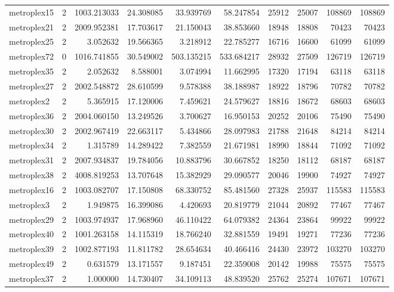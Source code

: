 \begin{longtable}{|l|r|r|r|r|r|r|r|r|r|}
metroplex15 & 2 & 1003.213033 & 24.308085 & 33.939769 & 58.247854 & 25912 & 25007 & 108869 & 108869 \\
metroplex21 & 2 & 2009.952381 & 17.703617 & 21.150043 & 38.853660 & 18948 & 18808 & 70423 & 70423 \\
metroplex25 & 2 & 3.052632 & 19.566365 & 3.218912 & 22.785277 & 16716 & 16600 & 61099 & 61099 \\
metroplex72 & 0 & 1016.741855 & 30.549002 & 503.135215 & 533.684217 & 28932 & 27509 & 126719 & 126719 \\
metroplex35 & 2 & 2.052632 & 8.588001 & 3.074994 & 11.662995 & 17320 & 17194 & 63118 & 63118 \\
metroplex27 & 2 & 2002.548872 & 28.610599 & 9.578388 & 38.188987 & 18922 & 18796 & 70782 & 70782 \\
metroplex2 & 2 & 5.365915 & 17.120006 & 7.459621 & 24.579627 & 18816 & 18672 & 68603 & 68603 \\
metroplex36 & 2 & 2004.060150 & 13.249526 & 3.700627 & 16.950153 & 20252 & 20106 & 75490 & 75490 \\
metroplex30 & 2 & 2002.967419 & 22.663117 & 5.434866 & 28.097983 & 21788 & 21648 & 84214 & 84214 \\
metroplex34 & 2 & 1.315789 & 14.289422 & 7.382559 & 21.671981 & 18990 & 18844 & 71092 & 71092 \\
metroplex31 & 2 & 2007.934837 & 19.784056 & 10.883796 & 30.667852 & 18250 & 18112 & 68187 & 68187 \\
metroplex38 & 2 & 4008.819253 & 13.707648 & 15.382929 & 29.090577 & 20046 & 19900 & 74927 & 74927 \\
metroplex16 & 2 & 1003.082707 & 17.150808 & 68.330752 & 85.481560 & 27328 & 25937 & 115583 & 115583 \\
metroplex3 & 2 & 1.949875 & 16.399086 & 4.420693 & 20.819779 & 21044 & 20892 & 77467 & 77467 \\
metroplex29 & 2 & 1003.974937 & 17.968960 & 46.110422 & 64.079382 & 24364 & 23864 & 99922 & 99922 \\
metroplex40 & 2 & 1001.263158 & 14.115319 & 18.766240 & 32.881559 & 19491 & 19271 & 77236 & 77236 \\
metroplex39 & 2 & 1002.877193 & 11.811782 & 28.654634 & 40.466416 & 24430 & 23972 & 103270 & 103270 \\
metroplex49 & 2 & 0.631579 & 13.171557 & 9.187451 & 22.359008 & 20142 & 19988 & 75575 & 75575 \\
metroplex37 & 2 & 1.000000 & 14.730407 & 34.109113 & 48.839520 & 25762 & 25274 & 107671 & 107671 \\

\end{longtable}
